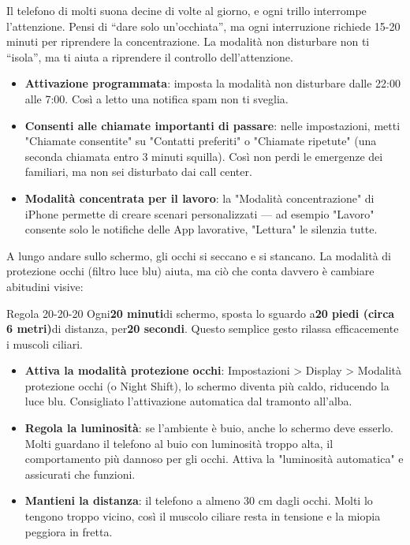
Il telefono di molti suona decine di volte al giorno, e ogni trillo interrompe l'attenzione. Pensi di “dare solo un'occhiata”, ma ogni interruzione richiede 15-20 minuti per riprendere la concentrazione. La modalità non disturbare non ti “isola”, ma ti aiuta a riprendere il controllo dell'attenzione.

\begin{itemize}
  \item \textbf{Attivazione programmata}: imposta la modalità non disturbare dalle 22:00 alle 7:00. Così a letto una notifica spam non ti sveglia.
  \item \textbf{Consenti alle chiamate importanti di passare}: nelle impostazioni, metti "Chiamate consentite" su "Contatti preferiti" o "Chiamate ripetute" (una seconda chiamata entro 3 minuti squilla). Così non perdi le emergenze dei familiari, ma non sei disturbato dai call center.
  \item \textbf{Modalità concentrata per il lavoro}: la "Modalità concentrazione" di iPhone permette di creare scenari personalizzati — ad esempio "Lavoro" consente solo le notifiche delle App lavorative, "Lettura" le silenzia tutte.
\end{itemize}


A lungo andare sullo schermo, gli occhi si seccano e si stancano. La modalità di protezione occhi (filtro luce blu) aiuta, ma ciò che conta davvero è cambiare abitudini visive:

\begin{tcbinfo}{Regola 20-20-20}
Ogni\textbf{20 minuti}di schermo, sposta lo sguardo a\textbf{20 piedi (circa 6 metri)}di distanza, per\textbf{20 secondi}. Questo semplice gesto rilassa efficacemente i muscoli ciliari.

\end{tcbinfo}

\begin{itemize}
  \item \textbf{Attiva la modalità protezione occhi}: Impostazioni > Display > Modalità protezione occhi (o Night Shift), lo schermo diventa più caldo, riducendo la luce blu. Consigliato l'attivazione automatica dal tramonto all'alba.
  \item \textbf{Regola la luminosità}: se l'ambiente è buio, anche lo schermo deve esserlo. Molti guardano il telefono al buio con luminosità troppo alta, il comportamento più dannoso per gli occhi. Attiva la "luminosità automatica" e assicurati che funzioni.
  \item \textbf{Mantieni la distanza}: il telefono a almeno 30 cm dagli occhi. Molti lo tengono troppo vicino, così il muscolo ciliare resta in tensione e la miopia peggiora in fretta.
\end{itemize}

